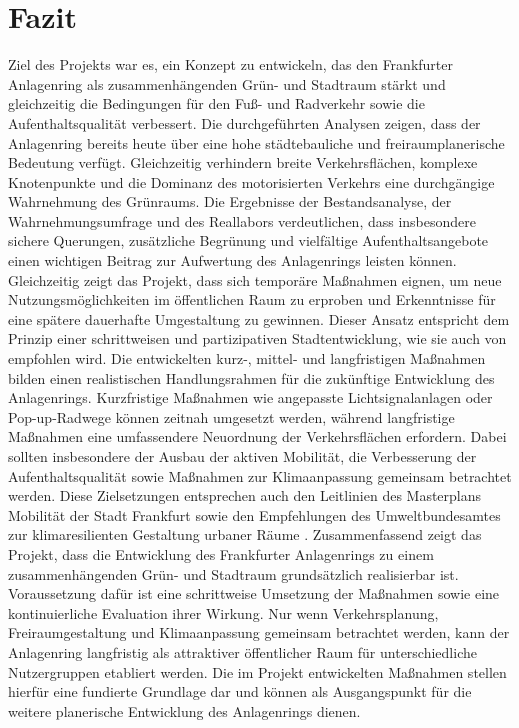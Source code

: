 \documentclass[a4paper,12pt]{article}
\begin{document}
\section{Fazit}
Ziel des Projekts war es, ein Konzept zu entwickeln, das den Frankfurter Anlagenring als zusammenhängenden Grün- und Stadtraum stärkt und gleichzeitig die Bedingungen für den Fuß- und Radverkehr sowie die Aufenthaltsqualität verbessert. Die durchgeführten Analysen zeigen, dass der Anlagenring bereits heute über eine hohe städtebauliche und freiraumplanerische Bedeutung verfügt. Gleichzeitig verhindern breite Verkehrsflächen, komplexe Knotenpunkte und die Dominanz des motorisierten Verkehrs eine durchgängige Wahrnehmung des Grünraums.
Die Ergebnisse der Bestandsanalyse, der Wahrnehmungsumfrage und des Reallabors verdeutlichen, dass insbesondere sichere Querungen, zusätzliche Begrünung und vielfältige Aufenthaltsangebote einen wichtigen Beitrag zur Aufwertung des Anlagenrings leisten können. Gleichzeitig zeigt das Projekt, dass sich temporäre Maßnahmen eignen, um neue Nutzungsmöglichkeiten im öffentlichen Raum zu erproben und Erkenntnisse für eine spätere dauerhafte Umgestaltung zu gewinnen. Dieser Ansatz entspricht dem Prinzip einer schrittweisen und partizipativen Stadtentwicklung, wie sie auch von \textcite{bbsrziz2025} empfohlen wird.
Die entwickelten kurz-, mittel- und langfristigen Maßnahmen bilden einen realistischen Handlungsrahmen für die zukünftige Entwicklung des Anlagenrings. Kurzfristige Maßnahmen wie angepasste Lichtsignalanlagen oder Pop-up-Radwege können zeitnah umgesetzt werden, während langfristige Maßnahmen eine umfassendere Neuordnung der Verkehrsflächen erfordern. Dabei sollten insbesondere der Ausbau der aktiven Mobilität, die Verbesserung der Aufenthaltsqualität sowie Maßnahmen zur Klimaanpassung gemeinsam betrachtet werden. Diese Zielsetzungen entsprechen auch den Leitlinien des Masterplans Mobilität der Stadt Frankfurt sowie den Empfehlungen des Umweltbundesamtes zur klimaresilienten Gestaltung urbaner Räume \autocite{stadtfrankfurtmasterplan2025,umweltbundesamt2022}.
Zusammenfassend zeigt das Projekt, dass die Entwicklung des Frankfurter Anlagenrings zu einem zusammenhängenden Grün- und Stadtraum grundsätzlich realisierbar ist. Voraussetzung dafür ist eine schrittweise Umsetzung der Maßnahmen sowie eine kontinuierliche Evaluation ihrer Wirkung. Nur wenn Verkehrsplanung, Freiraumgestaltung und Klimaanpassung gemeinsam betrachtet werden, kann der Anlagenring langfristig als attraktiver öffentlicher Raum für unterschiedliche Nutzergruppen etabliert werden. Die im Projekt entwickelten Maßnahmen stellen hierfür eine fundierte Grundlage dar und können als Ausgangspunkt für die weitere planerische Entwicklung des Anlagenrings dienen.
\end{document}
